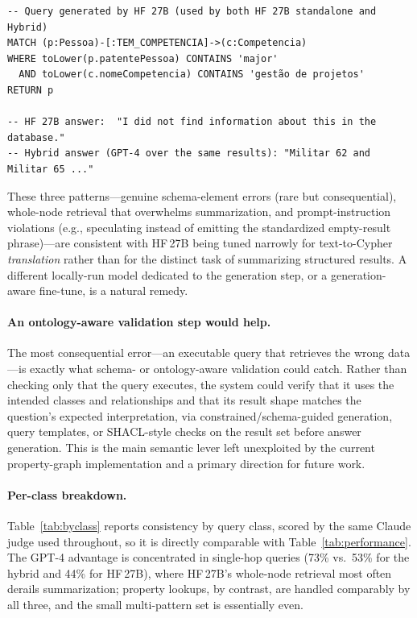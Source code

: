 \documentclass{ceurart}
\begin{document}
\begin{lstlisting}[style=cypher,caption={A summarization failure (Q1). HF\,27B and
the hybrid execute the \emph{same} query; HF\,27B's own generator reports an empty
answer, whereas GPT-4 summarizing the identical result set returns the correct
people. This isolates answer generation, not retrieval, as the fault.},label={lst:summ}]
-- Query generated by HF 27B (used by both HF 27B standalone and Hybrid)
MATCH (p:Pessoa)-[:TEM_COMPETENCIA]->(c:Competencia)
WHERE toLower(p.patentePessoa) CONTAINS 'major'
  AND toLower(c.nomeCompetencia) CONTAINS 'gestão de projetos'
RETURN p

-- HF 27B answer:  "I did not find information about this in the database."
-- Hybrid answer (GPT-4 over the same results): "Militar 62 and Militar 65 ..."
\end{lstlisting}

These three patterns---genuine schema-element errors (rare but consequential),
whole-node retrieval that overwhelms summarization, and prompt-instruction
violations (e.g., speculating instead of emitting the standardized empty-result
phrase)---are consistent with HF\,27B being tuned narrowly for text-to-Cypher
\emph{translation} rather than for the distinct task of summarizing structured
results. A different locally-run model dedicated to the generation step, or a
generation-aware fine-tune, is a natural remedy.

\paragraph{An ontology-aware validation step would help.}
The most consequential error---an executable query that retrieves the wrong
data---is exactly what schema- or ontology-aware validation could catch. Rather
than checking only that the query executes, the system could verify that it uses
the intended classes and relationships and that its result shape matches the
question's expected interpretation, via constrained/schema-guided generation, query
templates, or SHACL-style checks on the result set before answer generation. This
is the main semantic lever left unexploited by the current property-graph
implementation and a primary direction for future work.

\paragraph{Per-class breakdown.}
Table~\ref{tab:byclass} reports consistency by query class, scored by the same
Claude judge used throughout, so it is directly comparable with
Table~\ref{tab:performance}. The GPT-4 advantage is
concentrated in single-hop queries (73\% vs.\ 53\% for the hybrid and 44\% for
HF\,27B), where HF\,27B's whole-node retrieval most often derails summarization;
property lookups, by contrast, are handled comparably by all three, and the small
multi-pattern set is essentially even.
\end{document}
